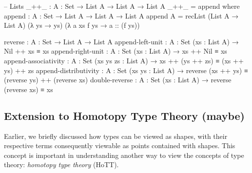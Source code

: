 \documentclass[12pt]{article}
\begin{document}
\begin{center}
\begin{minipage}{0.9\textwidth}
\begin{code}
-- Lists
_++_ : {A : Set} → List A → List A → List A
_++_ = append where
  append : {A : Set} → List A → List A → List A
  append {A} = recList (List A → List A)
                       (λ ys → ys)
                       (λ a xs f ys → a :: (f ys))

reverse : {A : Set} → List A → List A
append-left-unit : {A : Set} (xs : List A) → Nil ++ xs ≡ xs
append-right-unit : {A : Set} (xs : List A) → xs ++ Nil ≡ xs
append-associativity : {A : Set} (xs ys zs : List A) →
                       xs ++ (ys ++ zs) ≡ (xs ++ ys) ++ zs
append-distributivity : {A : Set} (xs ys : List A) →
                        reverse (xs ++ ys) ≡ (reverse ys) ++ (reverse xs) 
double-reverse : {A : Set} (xs : List A) → reverse (reverse xs) ≡ xs
\end{code}
\end{minipage}
\end{center}

\subsection*{Extension to Homotopy Type Theory (maybe)}
Earlier, we briefly discussed how types can be viewed as shapes, with their
respective terms consequently viewable as points contained with shapes. This
concept is important in understanding another way to view the concepts of type
theory: {\em homotopy type theory} (HoTT).
\end{document}
